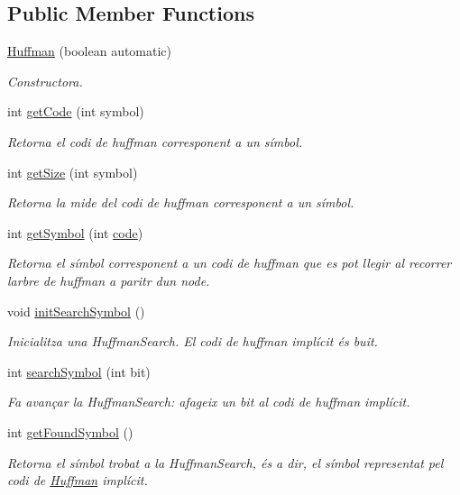 \subsection*{Public Member Functions}
\begin{DoxyCompactItemize}
\item 
\hyperlink{classdomini_1_1algorithm_1_1Huffman_ad5963e423f25e932ed78779bc000edaf}{Huffman} (boolean automatic)
\begin{DoxyCompactList}\small\item\em Constructora. \end{DoxyCompactList}\item 
int \hyperlink{classdomini_1_1algorithm_1_1Huffman_aed38ea297e6463f016a74d0ba405768a}{get\+Code} (int symbol)
\begin{DoxyCompactList}\small\item\em Retorna el codi de huffman corresponent a un símbol. \end{DoxyCompactList}\item 
int \hyperlink{classdomini_1_1algorithm_1_1Huffman_a2791541d1b5a3d65912fad5979d41dfd}{get\+Size} (int symbol)
\begin{DoxyCompactList}\small\item\em Retorna la mide del codi de huffman corresponent a un símbol. \end{DoxyCompactList}\item 
int \hyperlink{classdomini_1_1algorithm_1_1Huffman_a426cb1d15e2fe89a55e5b0f25e887342}{get\+Symbol} (int \hyperlink{classdomini_1_1algorithm_1_1Huffman_a6ff0cdc5b992431ccfe8d77971ebf5e8}{code})
\begin{DoxyCompactList}\small\item\em Retorna el símbol corresponent a un codi de huffman que es pot llegir al recorrer l\textquotesingle{}arbre de huffman a paritr d\textquotesingle{}un node. \end{DoxyCompactList}\item 
void \hyperlink{classdomini_1_1algorithm_1_1Huffman_aec935898b93387360acd588a05dc3f33}{init\+Search\+Symbol} ()
\begin{DoxyCompactList}\small\item\em Inicialitza una Huffman\+Search. El codi de huffman implícit és buit. \end{DoxyCompactList}\item 
int \hyperlink{classdomini_1_1algorithm_1_1Huffman_a56a954cb68aad6701b609d0fc2c7c724}{search\+Symbol} (int bit)
\begin{DoxyCompactList}\small\item\em Fa avançar la Huffman\+Search\+: afageix un bit al codi de huffman implícit. \end{DoxyCompactList}\item 
int \hyperlink{classdomini_1_1algorithm_1_1Huffman_a2fa5805057243c65769bf12435e5f363}{get\+Found\+Symbol} ()
\begin{DoxyCompactList}\small\item\em Retorna el símbol trobat a la Huffman\+Search, és a dir, el símbol representat pel codi de \hyperlink{classdomini_1_1algorithm_1_1Huffman}{Huffman} implícit. \end{DoxyCompactList}\end{DoxyCompactItemize}
